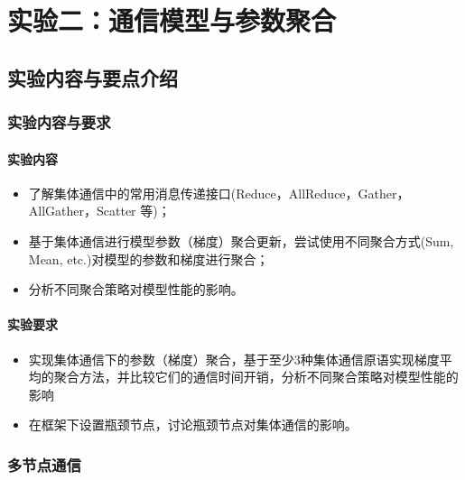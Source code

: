 \chapter{实验二：通信模型与参数聚合}

\section{实验内容与要点介绍}

\subsection{实验内容与要求}

\subsubsection{实验内容}
\begin{itemize}
    \item 了解集体通信中的常用消息传递接口(Reduce，AllReduce，Gather，AllGather，Scatter 等)；
    \item 基于集体通信进行模型参数（梯度）聚合更新，尝试使用不同聚合方式(Sum, Mean, etc.)对模型的参数和梯度进行聚合；
    \item 分析不同聚合策略对模型性能的影响。
\end{itemize}

\subsubsection{实验要求}
\begin{itemize}
    \item 实现集体通信下的参数（梯度）聚合，基于至少3种集体通信原语实现梯度平均的聚合方法，并比较它们的通信时间开销，分析不同聚合策略对模型性能的影响
    \item 在框架下设置瓶颈节点，讨论瓶颈节点对集体通信的影响。
\end{itemize}

\subsection{多节点通信}

